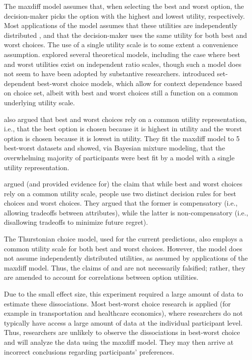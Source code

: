 The maxdiff model assumes that, when selecting the best and worst option, the decision-maker picks the option with the highest and lowest utility, respectively. Most applications of the model assumes that these utilities are independently distributed \parencite{flynn2014best}, and that the decision-maker uses the same utility for both best and worst choices. The use of a single utility scale is to some extent a convenience assumption. \textcite{marleyProbabilisticModelsBest2005} explored several theoretical models, including the case where best and worst utilities exist on independent ratio scales, though such a model does not seem to have been adopted by substantive researchers. \textcite{marleyProbabilisticModelsSetdependent2008} introduced set-dependent best-worst choice models, which allow for context dependence based on choice set, albeit with best and worst choices still a function on a common underlying utility scale. 

\textcite{hawkins2019like} also argued that best and worst choices rely on a common utility representation, i.e., that the best option is chosen because it is highest in utility and the worst option is chosen because it is lowest in utility. They fit the maxdiff model to 5 best-worst datasets and showed, via Bayesian mixture modeling, that the overwhelming majority of participants were best fit by a model with a single utility representation. 

\textcite{gervzinivc2021estimating} argued (and provided evidence for) the claim that while best and worst choices rely on a common utility scale, people use two distinct decision rules for best choices and worst choices. They argued that the former is compensatory (i.e., allowing tradeoffs between attributes), while the latter is non-compensatory (i.e., disallowing tradeoffs to minimize future regret). 

The Thurstonian choice model, used for the current predictions, also employs a common utility scale for both best and worst choices. However, the model does not assume independently distributed utilities, as assumed by applications of the maxdiff model. Thus, the claims of \textcite{hawkinsBestTimesWorst2014} and \textcite{hawkins2019like} are not necessarily falsified; rather, they are amended to account for correlations between option utilities. 

Due to the small effect size, this experiment required a large amount of data to estimate these dissociations. Most best-worst choice research is applied (for example in transportation and healthcare economics), where researchers do not typically have access a large amount of data at the individual participant level. Thus, researchers are unlikely to observe the dissociations in best-worst choice and will analyze the data using the maxdiff model. They may then arrive at incorrect conclusions regarding participants' preferences. 


